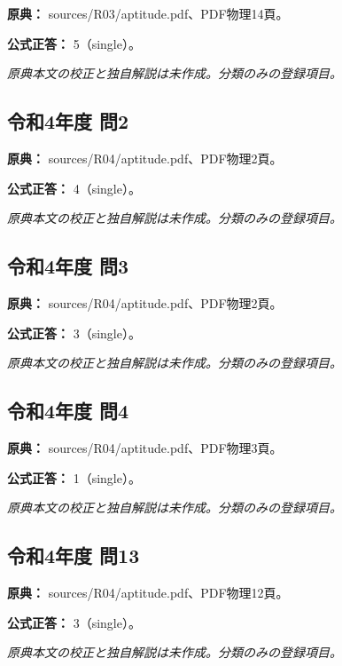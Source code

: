 \noindent\textbf{原典：} sources/R03/aptitude.pdf、PDF物理14頁。

\textbf{公式正答：} 5（single）。

\par\textit{原典本文の校正と独自解説は未作成。分類のみの登録項目。}

\subsection{令和4年度 問2}
\label{q:r04-reg-apt-02}

\noindent\textbf{原典：} sources/R04/aptitude.pdf、PDF物理2頁。

\textbf{公式正答：} 4（single）。

\par\textit{原典本文の校正と独自解説は未作成。分類のみの登録項目。}

\subsection{令和4年度 問3}
\label{q:r04-reg-apt-03}

\noindent\textbf{原典：} sources/R04/aptitude.pdf、PDF物理2頁。

\textbf{公式正答：} 3（single）。

\par\textit{原典本文の校正と独自解説は未作成。分類のみの登録項目。}

\subsection{令和4年度 問4}
\label{q:r04-reg-apt-04}

\noindent\textbf{原典：} sources/R04/aptitude.pdf、PDF物理3頁。

\textbf{公式正答：} 1（single）。

\par\textit{原典本文の校正と独自解説は未作成。分類のみの登録項目。}

\subsection{令和4年度 問13}
\label{q:r04-reg-apt-13}

\noindent\textbf{原典：} sources/R04/aptitude.pdf、PDF物理12頁。

\textbf{公式正答：} 3（single）。

\par\textit{原典本文の校正と独自解説は未作成。分類のみの登録項目。}

